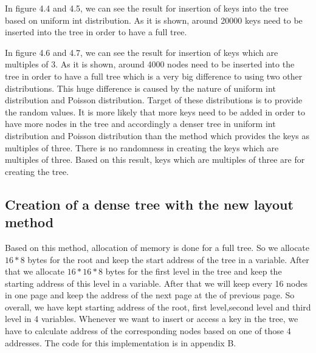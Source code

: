 \documentclass{report}
\begin{document}
In figure 4.4 and 4.5, we can see the result for insertion of keys into the tree based on uniform int distribution. As it is shown, around 20000 keys need to be inserted into the tree in order to have a full tree. 

In figure 4.6 and 4.7, we can see the result for insertion of keys which are multiples of 3. As it is shown, around 4000 nodes need to be inserted into the tree in order to have a full tree which is a very big difference to using two other distributions. This huge difference is caused by the nature of uniform int distribution and Poisson distribution. Target of these distributions is to provide the random values. It is more likely that more keys need to be added in order to have more nodes in the tree and accordingly a denser tree in uniform int distribution and Poisson distribution than the method which provides the keys as multiples of three. There is no randomness in creating the keys which are multiples of three. Based on this result, keys which are multiples of three are for creating the tree.  




\subsection{Creation of a dense tree with the new layout method}

Based on this method, allocation of memory is done for a full tree. So we allocate $16*8$ bytes for the root and keep the start address of the tree in a variable. After that we allocate $16*16*8$ bytes for the first level in the tree and keep the starting address of this level in a variable. After that we will keep every 16 nodes in one page and keep the address of the next page at the of previous page. So overall, we have kept starting address of the root, first level,second level and third level in 4 variables. Whenever we want to insert or access a key in the tree, we have to calculate address of the corresponding nodes based on one of those 4 addresses. The code for this implementation is in appendix B.
\end{document}
